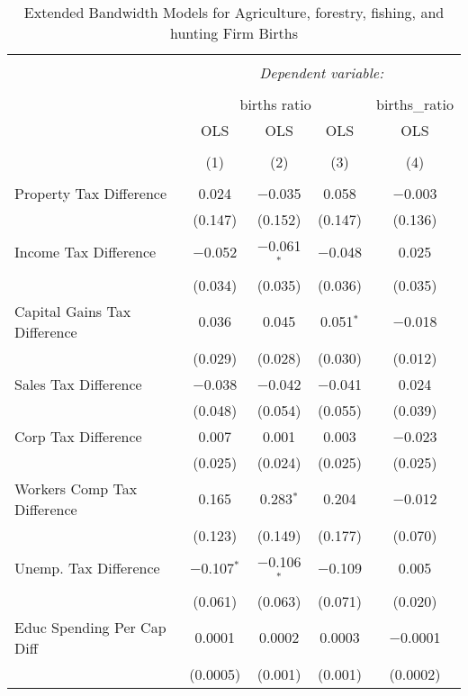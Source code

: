 
\begin{table}[!htbp] \centering 
  \caption{Extended Bandwidth Models for  Agriculture, forestry, fishing, and hunting Firm Births} 
  \label{11eb} 
\begin{tabular}{@{\extracolsep{5pt}}lcccc} 
\\[-1.8ex]\hline 
\hline \\[-1.8ex] 
 & \multicolumn{4}{c}{\textit{Dependent variable:}} \\ 
\cline{2-5} 
\\[-1.8ex] & \multicolumn{3}{c}{births ratio} & births\_ratio \\ 
 & OLS & OLS & OLS & OLS \\ 
\\[-1.8ex] & (1) & (2) & (3) & (4)\\ 
\hline \\[-1.8ex] 
 Property Tax Difference & 0.024 & $-$0.035 & 0.058 & $-$0.003 \\ 
  & (0.147) & (0.152) & (0.147) & (0.136) \\ 
  Income Tax Difference & $-$0.052 & $-$0.061$^{*}$ & $-$0.048 & 0.025 \\ 
  & (0.034) & (0.035) & (0.036) & (0.035) \\ 
  Capital Gains Tax Difference & 0.036 & 0.045 & 0.051$^{*}$ & $-$0.018 \\ 
  & (0.029) & (0.028) & (0.030) & (0.012) \\ 
  Sales Tax Difference & $-$0.038 & $-$0.042 & $-$0.041 & 0.024 \\ 
  & (0.048) & (0.054) & (0.055) & (0.039) \\ 
  Corp Tax Difference & 0.007 & 0.001 & 0.003 & $-$0.023 \\ 
  & (0.025) & (0.024) & (0.025) & (0.025) \\ 
  Workers Comp Tax Difference & 0.165 & 0.283$^{*}$ & 0.204 & $-$0.012 \\ 
  & (0.123) & (0.149) & (0.177) & (0.070) \\ 
  Unemp. Tax Difference & $-$0.107$^{*}$ & $-$0.106$^{*}$ & $-$0.109 & 0.005 \\ 
  & (0.061) & (0.063) & (0.071) & (0.020) \\ 
  Educ Spending Per Cap Diff & 0.0001 & 0.0002 & 0.0003 & $-$0.0001 \\ 
  & (0.0005) & (0.001) & (0.001) & (0.0002) \\ 

\end{tabular}
\end{table}
